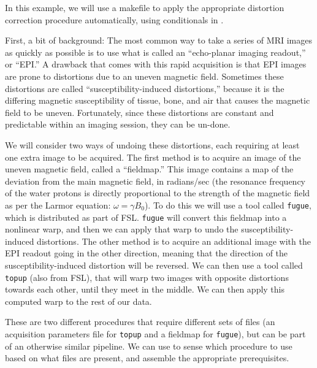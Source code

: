 
In this example, we will use a makefile to apply the appropriate distortion correction procedure automatically, using conditionals in \maken{}.

First, a bit of background: The most common way to take a series of MRI images as quickly as possible is to use what is called an ``echo-planar imaging readout,'' or ``EPI.'' A drawback that comes with this rapid acquisition is that EPI images are prone to distortions due to an uneven magnetic field. Sometimes these distortions are called ``susceptibility-induced distortions,'' because it is the differing magnetic susceptibility of tissue, bone, and air that causes the magnetic field to be uneven. Fortunately, since these distortions are constant and predictable within an imaging session, they can be un-done.

We will consider two ways of undoing these distortions, each requiring at least one extra image to be acquired. The first method is to acquire an image of the uneven magnetic field, called a ``fieldmap.'' This image contains a map of the deviation from the main magnetic field, in radians/sec (the resonance frequency of the water protons is directly proportional to the strength of the magnetic field as per the Larmor equation: $\omega=\gamma B _{0}$). To do this we will use a tool called \texttt{fugue}, which is distributed as part of FSL. \texttt{fugue} will convert this fieldmap into a nonlinear warp, and then we can apply that warp to undo the susceptibility-induced distortions. The other method is to acquire an additional image with the EPI readout going in the other direction, meaning that the direction of the susceptibility-induced distortion will be reversed. We can then use a tool called \texttt{topup} (also from FSL), that will warp two images with opposite distortions towards each other, until they meet in the middle. We can then apply this computed warp to the rest of our data.

These are two different procedures that require different sets of files (an acquisition parameters file for \texttt{topup} and a fieldmap for \texttt{fugue}), but can be part of an otherwise similar pipeline. We can use \maken{} to sense which procedure to use based on what files are present, and assemble the appropriate prerequisites.

